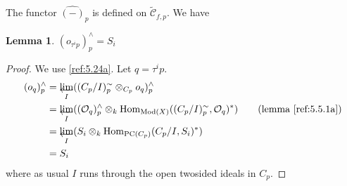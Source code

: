 \documentclass{amsproc}
\def\Cscr{{\mathcal C}}
\def\Oscr{{\mathcal O}}
\def\Hom{\operatorname {Hom}}
\def\Qch{\operatorname {Mod}}
\let\oldtext\text
\def\text#1{\oldtext{\upshape #1}}
\let\invlim\projlim
\DeclareMathOperator{\PC}{PC}
\newtheorem{lemmas}{Lemma}[subsection]
\theoremstyle{definition}
\theoremstyle{remark}
\def\invlim{\mathop{\vtop{\baselineskip -100pt\lineskip -1pt\lineskiplimit 0pt
\setbox0\hbox{\upshape lim}\copy0\hbox to \wd0{\leftarrowfill}}}\limits}
\numberwithin{equation}{section}
\numberwithin{table}{section}
\numberwithin{figure}{section}
\begin{document}
The functor $\hat{(-)}_p$ is defined on 
$\tilde{\Cscr}_{f,p}$. We have
\begin{lemmas}
\label{ref:5.5.8a}
$(o_{\tau^i p})^\wedge_p=S_i$
\end{lemmas}
\begin{proof}
We use \eqref{ref:5.24a}. Let $q=\tau^i p$.
\begin{align*}
(o_q)^\wedge_p&=\invlim_I ((C_p/I)^\sim_p\otimes_{C_p} o_q)^\wedge_p\\
&=\invlim_I((\Oscr_q)^\wedge_p\otimes_k  \Hom_{\Qch(X)}((C_p/I)^\sim_p
,\Oscr_q)^\ast)\qquad (\text{lemma \ref{ref:5.5.1a}})      \\
&=\invlim_I(S_i\otimes_k  \Hom_{\PC(C_p)}(C_p/I,S_i)^\ast)\\
&=S_i
\end{align*}
where as usual $I$ runs through the open twosided ideals in $C_p$.
\end{proof}
\end{document}
